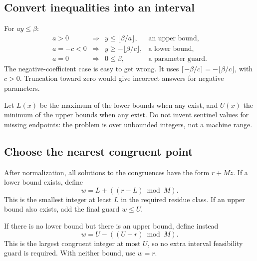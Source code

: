 \subsection{Convert inequalities into an interval}
For $a y\le\beta$:
\[
 \begin{array}{rcll}
 a>0 &\Rightarrow& y\le\lfloor\beta/a\rfloor, &\text{an upper bound},\\[2pt]
 a=-c<0 &\Rightarrow& y\ge-\lfloor\beta/c\rfloor, &\text{a lower bound},\\[2pt]
 a=0 &\Rightarrow& 0\le\beta, &\text{a parameter guard}.
 \end{array}
\]
The negative-coefficient case is easy to get wrong. It uses
$\lceil-\beta/c\rceil=-\lfloor\beta/c\rfloor$, with $c>0$. Truncation toward
zero would give incorrect answers for negative parameters.

Let $L(x)$ be the maximum of the lower bounds when any exist, and $U(x)$ the
minimum of the upper bounds when any exist. Do not invent sentinel values for
missing endpoints: the problem is over unbounded integers, not a machine range.

\subsection{Choose the nearest congruent point}
After normalization, all solutions to the congruences have the form $r+Mz$.
If a lower bound exists, define
\begin{equation}
\label{eq:lower-witness}
 w=L+((r-L)\bmod M).
\end{equation}
This is the smallest integer at least $L$ in the required residue class. If an
upper bound also exists, add the final guard $w\le U$.

If there is no lower bound but there is an upper bound, define instead
\begin{equation}
\label{eq:upper-witness}
 w=U-((U-r)\bmod M).
\end{equation}
This is the largest congruent integer at most $U$, so no extra interval
feasibility guard is required. With neither bound, use $w=r$.

